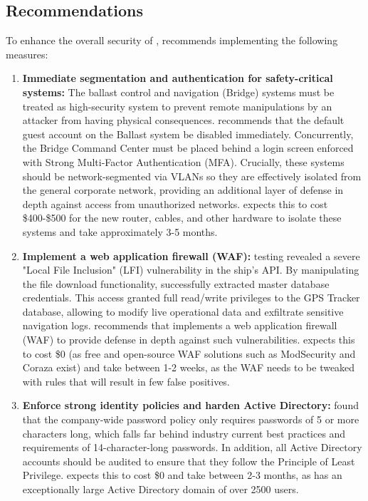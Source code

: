 \newpage
\subsection{Recommendations}        

To enhance the overall security of \clientNoSpace, \team recommends implementing the following measures: 

\begin{enumerate}
    \item \textbf{Immediate segmentation and authentication for safety-critical systems:} The ballast control and navigation (Bridge) systems must be treated as high-security system to prevent remote manipulations by an attacker from having physical consequences. \team recommends that the default guest account on the Ballast system be disabled immediately. Concurrently, the Bridge Command Center must be placed behind a login screen enforced with Strong Multi-Factor Authentication (MFA). Crucially, these systems should be network-segmented via VLANs so they are effectively isolated from the general corporate network, providing an additional layer of defense in depth against access from unauthorized networks. \team expects this to cost \$400-\$500 for the new router, cables, and other hardware to isolate these systems and take approximately 3-5 months.

    \item \textbf{Implement a web application firewall (WAF):} \teamP testing revealed a severe "Local File Inclusion" (LFI) vulnerability in the ship's API. By manipulating the file download functionality, \team successfully extracted master database credentials. This access granted full read/write privileges to the GPS Tracker database, allowing \team to modify live operational data and exfiltrate sensitive navigation logs. \teamP recommends that \client implements a web application firewall (WAF) to provide defense in depth against such vulnerabilities. \team expects this to cost \$0 (as free and open-source WAF solutions such as ModSecurity and Coraza exist) and take between 1-2 weeks, as the WAF needs to be tweaked with rules that will result in few false positives.
    
    \item \textbf{Enforce strong identity policies and harden Active Directory:}  
    \teamP found that the company-wide password policy only requires passwords of 5 or more characters long, which falls far behind industry current best practices and requirements of 14-character-long passwords. In addition, all Active Directory accounts should be audited to ensure that they follow the Principle of Least Privilege. \team expects this to cost \$0 and take between 2-3 months, as \client has an exceptionally large Active Directory domain of over 2500 users. 
\end{enumerate}